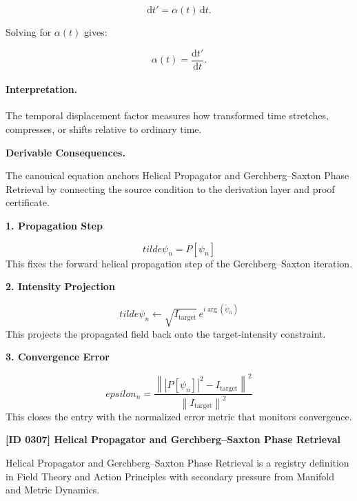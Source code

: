 \begin{equation}
\mathrm{d}t' = \alpha(t)\,\mathrm{d}t .
\end{equation}

Solving for $\alpha(t)$ gives:

\begin{equation}
\boxed{
\alpha(t)=\frac{\mathrm{d}t'}{\mathrm{d}t}.
}
\end{equation}

\paragraph{Interpretation.}
The temporal displacement factor measures how transformed time stretches, compresses, or shifts relative to ordinary time.

\par\vspace{0.35em}
\noindent\textbf{Derivable Consequences.}\quad
\begingroup
\footnotesize
\raggedright
The canonical equation anchors Helical Propagator and Gerchberg--Saxton Phase Retrieval by connecting the source condition to the derivation layer and proof certificate.
\par\endgroup

\noindent\textbf{1. Propagation Step}\par
\[
tilde{\psi}_n=P[\psi_n]
\]
\noindent This fixes the forward helical propagation step of the Gerchberg--Saxton iteration.\par
\noindent\textbf{2. Intensity Projection}\par
\[
tilde{\psi}_n\leftarrow \sqrt{I_{\mathrm{target}}}\,e^{i\arg(\tilde{\psi}_n)}
\]
\noindent This projects the propagated field back onto the target-intensity constraint.\par
\noindent\textbf{3. Convergence Error}\par
\[
epsilon_n=\frac{\left\||P[\psi_n]|^2-I_{\mathrm{target}}\right\|^2}{\left\|I_{\mathrm{target}}\right\|^2}
\]
\noindent This closes the entry with the normalized error metric that monitors convergence.\par

\clearpage
\noindent\textbf{[ID 0307] Helical Propagator and Gerchberg--Saxton Phase Retrieval}\par
\vspace{0.35em}
\begingroup\small
{}
Helical Propagator and Gerchberg--Saxton Phase Retrieval is a registry definition in Field Theory and Action Principles with secondary pressure from Manifold and Metric Dynamics.

